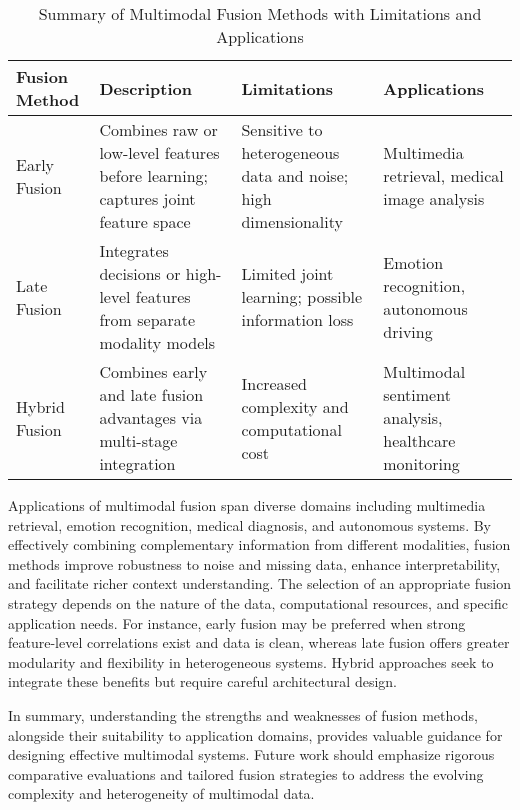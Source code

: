\documentclass[sigconf]{acmart}
\begin{document}
\begin{table*}[htbp]
\centering
\caption{Summary of Multimodal Fusion Methods with Limitations and Applications}
\label{table:fusion_summary}
\begin{adjustbox}{max width=\textwidth}
\begin{tabular}{@{}llll@{}}
\toprule
\textbf{Fusion Method} & \textbf{Description} & \textbf{Limitations} & \textbf{Applications} \\ \midrule
Early Fusion & Combines raw or low-level features before learning; captures joint feature space & Sensitive to heterogeneous data and noise; high dimensionality & Multimedia retrieval, medical image analysis \\
Late Fusion & Integrates decisions or high-level features from separate modality models & Limited joint learning; possible information loss & Emotion recognition, autonomous driving \\
Hybrid Fusion & Combines early and late fusion advantages via multi-stage integration & Increased complexity and computational cost & Multimodal sentiment analysis, healthcare monitoring \\ \bottomrule
\end{tabular}
\end{adjustbox}
\end{table*}

Applications of multimodal fusion span diverse domains including multimedia retrieval, emotion recognition, medical diagnosis, and autonomous systems. By effectively combining complementary information from different modalities, fusion methods improve robustness to noise and missing data, enhance interpretability, and facilitate richer context understanding. The selection of an appropriate fusion strategy depends on the nature of the data, computational resources, and specific application needs. For instance, early fusion may be preferred when strong feature-level correlations exist and data is clean, whereas late fusion offers greater modularity and flexibility in heterogeneous systems. Hybrid approaches seek to integrate these benefits but require careful architectural design.

In summary, understanding the strengths and weaknesses of fusion methods, alongside their suitability to application domains, provides valuable guidance for designing effective multimodal systems. Future work should emphasize rigorous comparative evaluations and tailored fusion strategies to address the evolving complexity and heterogeneity of multimodal data.
\end{document}
